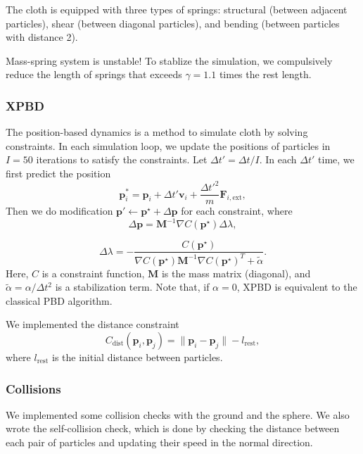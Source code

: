 The cloth is equipped with three types of springs: structural (between adjacent particles), shear (between diagonal particles), and bending (between particles with distance 2). 

Mass-spring system is unstable! To stablize the simulation, we compulsively reduce the length of springs that exceeds $\gamma=1.1$ times the rest length.

\subsubsection{XPBD}

The position-based dynamics is a method to simulate cloth by solving constraints. In each simulation loop, we update the positions of particles in $I=50$ iterations to satisfy the constraints. Let $\Delta t'=\Delta t/I$. In each $\Delta t'$ time, we first predict the position
\begin{equation}
  \label{eq-xpbd-1}
\mathbf{p}_i^*=\mathbf{p}_i+\Delta t'\mathbf{v}_i+\frac{\Delta t'^2}{m}\mathbf{F}_{i,\text{ext}},
\end{equation}
Then we do modification $\mathbf{p}'\leftarrow\mathbf{p}^\star +\Delta \mathbf{p}$ for each constraint, where
\begin{equation}
  \label{eq-xpbd-2}
\Delta \mathbf{p}=\mathbf{M}^{-1} \nabla C(\mathbf{p}^\star)\Delta \lambda,
\end{equation}

\begin{equation}
  \label{eq-xpbd-3}
\Delta \lambda = -\frac{C(\mathbf{p}^\star)}{\nabla C(\mathbf{p}^\star)\mathbf{M}^{-1}\nabla C(\mathbf{p}^\star)^T + \tilde \alpha}.
\end{equation}
Here, $C$ is a constraint function, $\mathbf{M}$ is the mass matrix (diagonal), and $\tilde \alpha=\alpha/\Delta t^2$ is a stabilization term. Note that, if $\alpha=0$, XPBD is equivalent to the classical PBD algorithm.

We implemented the distance constraint
\begin{equation}
  \label{eq-xpbd-4}
C_{\text{dist}}(\mathbf{p}_i,\mathbf{p}_j)=\|\mathbf{p}_i-\mathbf{p}_j\|-l_{\text{rest}},
\end{equation}
where $l_{\text{rest}}$ is the initial distance between particles.

\subsubsection{Collisions} We implemented some collision checks with the ground and the sphere. We also wrote the self-collision check, which is done by checking the distance between each pair of particles and updating their speed in the normal direction.

